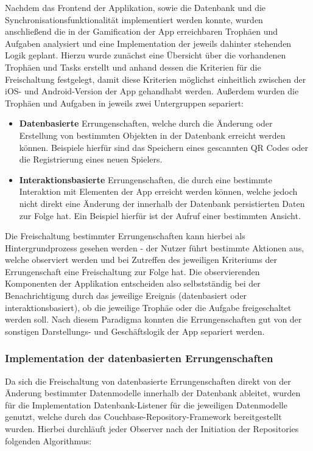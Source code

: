 Nachdem das Frontend der Applikation, sowie die Datenbank und die Synchronisationsfunktionalität implementiert werden konnte, wurden anschließend die in der Gamification der App erreichbaren Trophäen und Aufgaben analysiert und eine Implementation der jeweils dahinter stehenden Logik geplant. Hierzu wurde zunächst eine Übersicht über die vorhandenen Trophäen und Tasks erstellt und anhand dessen die Kriterien für die Freischaltung festgelegt, damit diese Kriterien möglichst einheitlich zwischen der iOS- und Android-Version der App gehandhabt werden. Außerdem wurden die Trophäen und Aufgaben in jeweils zwei Untergruppen separiert:

\begin{itemize}
    \item \textbf{Datenbasierte} Errungenschaften, welche durch die Änderung oder Erstellung von bestimmten Objekten in der Datenbank erreicht werden können. Beispiele hierfür sind das Speichern eines gescannten QR Codes oder die Registrierung eines neuen Spielers.
    \item \textbf{Interaktionsbasierte} Errungenschaften, die durch eine bestimmte Interaktion mit Elementen der App erreicht werden können, welche jedoch nicht direkt eine Änderung der innerhalb der Datenbank persistierten Daten zur Folge hat. Ein Beispiel hierfür ist der Aufruf einer bestimmten Ansicht.
\end{itemize}

\noindent Die Freischaltung bestimmter Errungenschaften kann hierbei als Hintergrundprozess gesehen werden - der Nutzer führt bestimmte Aktionen aus, welche observiert werden und bei Zutreffen des jeweiligen Kriteriums der Errungenschaft eine Freischaltung zur Folge hat. Die observierenden Komponenten der Applikation entscheiden also selbstständig bei der Benachrichtigung durch das jeweilige Ereignis (datenbasiert oder interaktionsbasiert), ob die jeweilige Trophäe oder die Aufgabe freigeschaltet werden soll. Nach diesem Paradigma konnten die Errungenschaften gut von der sonstigen Darstellungs- und Geschäftslogik der App separiert werden.

\subsubsection{Implementation der datenbasierten Errungenschaften}

Da sich die Freischaltung von datenbasierte Errungenschaften direkt von der Änderung bestimmter Datenmodelle innerhalb der Datenbank ableitet, wurden für die Implementation Datenbank-Listener für die jeweiligen Datenmodelle genutzt, welche durch das Couchbase-Repository-Framework bereitgestellt wurden. Hierbei durchläuft jeder Observer nach der Initiation der Repositories folgenden Algorithmus:

